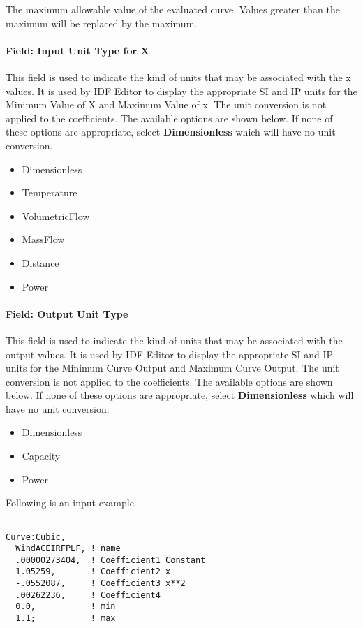 The maximum allowable value of the evaluated curve. Values greater than the maximum will be replaced by the maximum.

\paragraph{Field: Input Unit Type for X}\label{field-input-unit-type-for-x-3}

This field is used to indicate the kind of units that may be associated with the x values. It is used by IDF Editor to display the appropriate SI and IP units for the Minimum Value of X and Maximum Value of x. The unit conversion is not applied to the coefficients. The available options are shown below. If none of these options are appropriate, select \textbf{Dimensionless} which will have no unit conversion.

\begin{itemize}
\item
  Dimensionless
\item
  Temperature
\item
  VolumetricFlow
\item
  MassFlow
\item
  Distance
\item
  Power
\end{itemize}

\paragraph{Field: Output Unit Type}\label{field-output-unit-type-2}

This field is used to indicate the kind of units that may be associated with the output values. It is used by IDF Editor to display the appropriate SI and IP units for the Minimum Curve Output and Maximum Curve Output. The unit conversion is not applied to the coefficients. The available options are shown below. If none of these options are appropriate, select \textbf{Dimensionless} which will have no unit conversion.

\begin{itemize}
\item
  Dimensionless
\item
  Capacity
\item
  Power
\end{itemize}

Following is an input example.

\begin{lstlisting}

Curve:Cubic,
  WindACEIRFPLF, ! name
  .00000273404,  ! Coefficient1 Constant
  1.05259,       ! Coefficient2 x
  -.0552087,     ! Coefficient3 x**2
  .00262236,     ! Coefficient4
  0.0,           ! min
  1.1;           ! max
\end{lstlisting}

